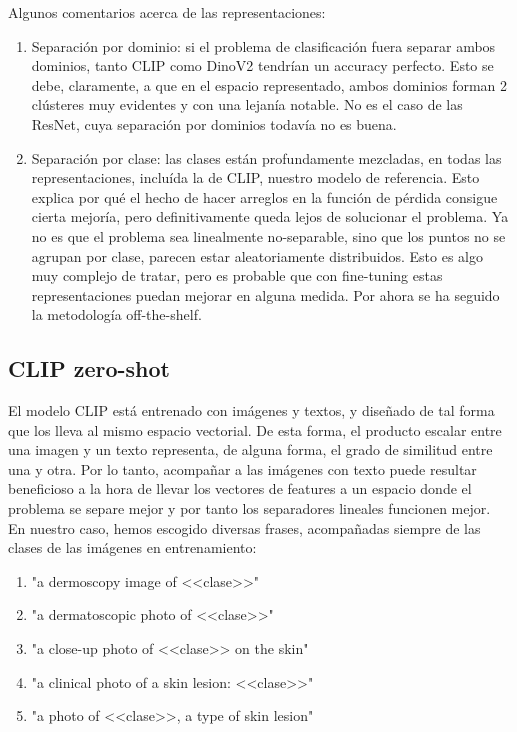\documentclass[10pt,a4paper]{article}
\renewcommand{\_}{\guionbajo\allowbreak}
\begin{document}
\noindent Algunos comentarios acerca de las representaciones:

\begin{enumerate}
    \item Separación por dominio: si el problema de clasificación fuera separar ambos dominios, tanto CLIP como DinoV2 tendrían un accuracy perfecto. 
    Esto se debe, claramente, a que en el espacio representado, ambos dominios forman 2 clústeres muy evidentes y con una lejanía notable. 
    No es el caso de las ResNet, cuya separación por dominios todavía no es buena. 
    \item Separación por clase: las clases están profundamente mezcladas, en todas las representaciones, incluída la de CLIP, nuestro modelo de referencia. 
    Esto explica por qué el hecho de hacer arreglos en la función de pérdida consigue cierta mejoría, pero definitivamente queda lejos de solucionar el 
    problema. Ya no es que el problema sea linealmente no-separable, sino que los puntos no se agrupan por clase, parecen estar aleatoriamente distribuidos. 
    Esto es algo muy complejo de tratar, pero es probable que con fine-tuning estas representaciones puedan mejorar en alguna medida. Por ahora se ha seguido
    la metodología off-the-shelf. 
\end{enumerate}

\subsection{CLIP zero-shot}
\label{subsec:zero-shot}

\noindent El modelo CLIP está entrenado con imágenes y textos, y diseñado de tal forma que los lleva al mismo espacio vectorial. De esta forma, el producto escalar 
entre una imagen y un texto representa, de alguna forma, el grado de similitud entre una y otra. Por lo tanto, acompañar a las imágenes con texto puede resultar 
beneficioso a la hora de llevar los vectores de features a un espacio donde el problema se separe mejor y por tanto los separadores lineales funcionen mejor. En 
nuestro caso, hemos escogido diversas frases, acompañadas siempre de las clases de las imágenes en entrenamiento: 

\begin{enumerate}
    \item "a dermoscopy image of <<clase>>"
    \item "a dermatoscopic photo of <<clase>>"
    \item "a close-up photo of <<clase>> on the skin"
    \item "a clinical photo of a skin lesion: <<clase>>"
    \item "a photo of <<clase>>, a type of skin lesion"
\end{enumerate}
\end{document}
